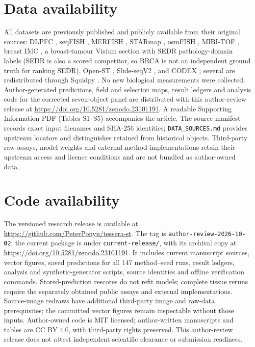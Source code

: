 \documentclass[11pt]{article}
\begin{document}
\section*{Data availability}
All datasets are previously published and publicly available from their original sources: DLPFC
\citep{maynard2021dlpfc}, seqFISH \citep{lohoff2022seqfish}, MERFISH \citep{moffitt2018merfish}, STARmap
\citep{wang2018starmap}, osmFISH \citep{codeluppi2018osmfish}, MIBI-TOF \citep{hartmann2021scmep}, breast IMC
\citep{jackson2020imc}, a breast-tumour Visium section \citep{tenx2020brca} with SEDR pathology-domain labels
\citep{xu2024sedr} (SEDR is also a scored competitor, so BRCA is not an independent ground truth for
ranking SEDR), Open-ST \citep{schott2024openst}, Slide-seqV2 \citep{stickels2021slideseq}, and
CODEX \citep{goltsev2018codex}; several are redistributed through Squidpy \citep{palla2022squidpy}. No new biological measurements were collected. Author-generated predictions, field and selection maps, result ledgers and analysis code for the corrected seven-object panel are distributed with this author-review release at \url{https://doi.org/10.5281/zenodo.23101191}. A readable Supporting Information PDF (Tables S1--S5) accompanies the article. The source manifest records exact input filenames and SHA-256 identities; \texttt{DATA\_SOURCES.md} provides upstream locators and distinguishes retained from historical objects. Third-party raw assays, model weights and external method implementations retain their upstream access and licence conditions and are not bundled as author-owned data.

\section*{Code availability}
The versioned research release is available at \url{https://github.com/PeterPonyu/tessera-st}. The tag is \texttt{author-review-2026-10-02}; the current package is under \texttt{current-release/}, with its archival copy at \url{https://doi.org/10.5281/zenodo.23101191}. It includes current manuscript sources, vector figures, saved predictions for all 147 method--seed runs, result ledgers, analysis and synthetic-generator scripts, source identities and offline verification commands. Stored-prediction rescores do not refit models; complete tissue reruns require the separately obtained public assays and external implementations. Source-image redraws have additional third-party image and raw-data prerequisites; the committed vector figures remain inspectable without those inputs. Author-owned code is MIT licensed; author-written manuscripts and tables are CC BY 4.0, with third-party rights preserved. This author-review release does not attest independent scientific clearance or submission readiness.
\end{document}
